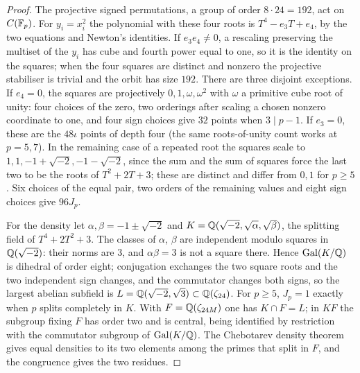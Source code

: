 \begin{proof}
The projective signed permutations, a group of order $8\cdot24=192$, act on
$C(\mathbb{F}_p)$. For $y_i=x_i^2$ the polynomial with these four roots is
$T^4-e_3T+e_4$, by the two equations and Newton's identities. If
$e_3e_4\ne0$, a rescaling preserving the multiset of the $y_i$ has cube and
fourth power equal to one, so it is the identity on the squares; when the
four squares are distinct and nonzero the projective stabiliser is trivial
and the orbit has size $192$. There are three disjoint exceptions. If
$e_4=0$, the squares are projectively $0,1,\omega,\omega^2$ with $\omega$ a
primitive cube root of unity: four choices of the zero, two orderings after
scaling a chosen nonzero coordinate to one, and four sign choices give $32$
points when $3\mid p-1$. If $e_3=0$, these are the $48\iota$ points of
depth four (the same roots-of-unity count works at $p=5,7$). In the
remaining case of a repeated root the squares scale to
$1,1,-1+\sqrt{-2},-1-\sqrt{-2}$, since the sum and the sum of squares force
the last two to be the roots of $T^2+2T+3$; these are distinct and differ
from $0,1$ for $p\ge5$. Six choices of the equal pair, two orders of the
remaining values and eight sign choices give $96J_p$.

For the density let $\alpha,\beta=-1\pm\sqrt{-2}$ and
$K=\mathbb{Q}(\sqrt{-2},\sqrt\alpha,\sqrt\beta)$, the splitting field of
$T^4+2T^2+3$. The classes of $\alpha$, $\beta$ are independent modulo
squares in $\mathbb{Q}(\sqrt{-2})$: their norms are $3$, and $\alpha\beta=3$ is not
a square there. Hence $\operatorname{Gal}(K/\mathbb{Q})$ is dihedral of order
eight; conjugation exchanges the two square roots and the two independent
sign changes, and the commutator changes both signs, so the largest
abelian subfield is $L=\mathbb{Q}(\sqrt{-2},\sqrt3)\subset\mathbb{Q}(\zeta_{24})$. For
$p\ge5$, $J_p=1$ exactly when $p$ splits completely in $K$. With
$F=\mathbb{Q}(\zeta_{24M})$ one has $K\cap F=L$; in $KF$ the subgroup fixing $F$ has
order two and is central, being identified by restriction with the
commutator subgroup of $\operatorname{Gal}(K/\mathbb{Q})$. The Chebotarev density
theorem gives equal densities to its two elements among the primes that
split in $F$, and the congruence gives the two residues.
\end{proof}


